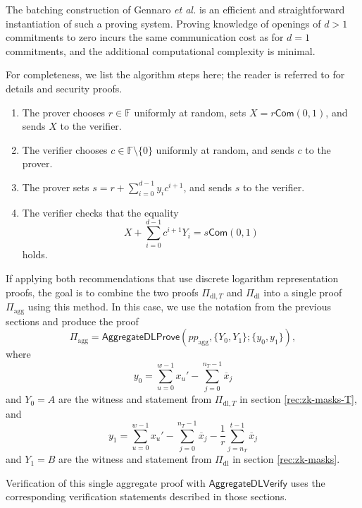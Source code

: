 \documentclass{article}
\newcommand{\F}{\mathbb{F}}
\newcommand{\func}[1]{\mathsf{#1}}
\newcommand{\com}{\func{Com}}
\begin{document}
The batching construction of Gennaro \textit{et al.} \cite{schnorr} is an efficient and straightforward instantiation of such a proving system.
Proving knowledge of openings of $d > 1$ commitments to zero incurs the same communication cost as for $d = 1$ commitments, and the additional computational complexity is minimal.

For completeness, we list the algorithm steps here; the reader is referred to \cite{schnorr} for details and security proofs.

\begin{enumerate}
    \item The prover chooses $r \in \F$ uniformly at random, sets $X = r\com(0,1)$, and sends $X$ to the verifier.
    \item The verifier chooses $c \in \F \setminus \{0\}$ uniformly at random, and sends $c$ to the prover.
    \item The prover sets $s = r + \sum_{i=0}^{d-1} y_i c^{i+1}$, and sends $s$ to the verifier.
    \item The verifier checks that the equality $$X + \sum_{i=0}^{d-1} c^{i+1}Y_i = s\com(0,1)$$ holds.
\end{enumerate}

If applying both recommendations that use discrete logarithm representation proofs, the goal is to combine the two proofs $\Pi_{\text{dl},T}$ and $\Pi_{\text{dl}}$ into a single proof $\Pi_{\text{agg}}$ using this method.
In this case, we use the notation from the previous sections and produce the proof
$$\Pi_{\text{agg}} = \func{AggregateDLProve}(pp_{\text{agg}}, \{Y_0,Y_1\} ; \{y_0,y_1\}),$$
where
$$y_0 = \sum_{u=0}^{w-1} x_u' - \sum_{j=0}^{n_T-1} \overline{x}_j$$
and $Y_0 = A$ are the witness and statement from $\Pi_{\text{dl},T}$ in section \ref{rec:zk-masks-T}, and
$$y_1 = \sum_{u=0}^{w-1} x_u' - \sum_{j=0}^{n_T-1} \overline{x}_j - \frac{1}{r} \sum_{j=n_T}^{t-1} \overline{x}_j$$
and $Y_1 = B$ are the witness and statement from $\Pi_{\text{dl}}$ in section \ref{rec:zk-masks}.

Verification of this single aggregate proof with $\func{AggregateDLVerify}$ uses the corresponding verification statements described in those sections.




\end{document}
